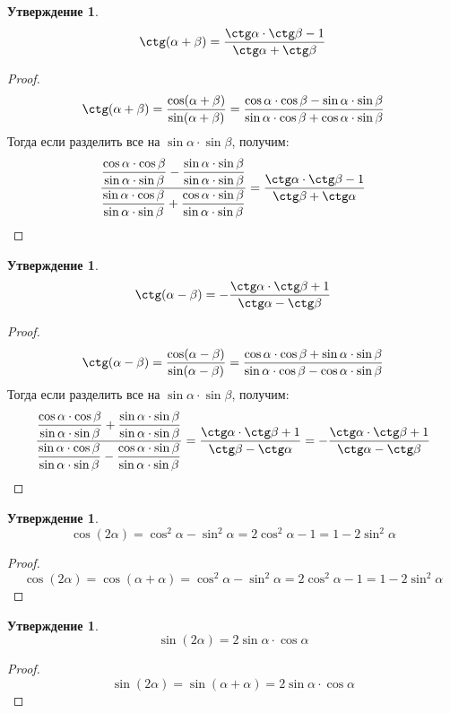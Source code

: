 \documentclass[12pt]{article}
\theoremstyle{definition}
\newtheorem{statement}[theorem]{Утверждение}
\begin{document}
    \begin{statement}
        $$\ctg(\alpha+\beta)=\dfrac{\ctg\alpha\cdot\ctg\beta-1}{\ctg\alpha+\ctg\beta}$$
    \end{statement}
    \begin{proof}
        $$\ctg(\alpha+\beta)=\dfrac{\cos(\alpha+\beta)}{\sin(\alpha+\beta)}=\dfrac{\cos\alpha\cdot\cos\beta-\sin\alpha\cdot\sin\beta}{\sin\alpha\cdot\cos\beta+\cos\alpha\cdot\sin\beta}$$
        Тогда если разделить все на $\sin\alpha\cdot\sin\beta$, получим:
        $$\dfrac{\dfrac{\cos\alpha\cdot\cos\beta}{\sin\alpha\cdot\sin\beta}-\dfrac{\sin\alpha\cdot\sin\beta}{\sin\alpha\cdot\sin\beta}}{\dfrac{\sin\alpha\cdot\cos\beta}{\sin\alpha\cdot\sin\beta}+\dfrac{\cos\alpha\cdot\sin\beta}{\sin\alpha\cdot\sin\beta}}=\dfrac{\ctg\alpha\cdot\ctg\beta-1}{\ctg\beta+\ctg\alpha}$$
    \end{proof}
    \begin{statement}
        $$\ctg(\alpha-\beta)=-\dfrac{\ctg\alpha\cdot\ctg\beta+1}{\ctg\alpha-\ctg\beta}$$
    \end{statement}
    \begin{proof}
        $$\ctg(\alpha-\beta)=\dfrac{\cos(\alpha-\beta)}{\sin(\alpha-\beta)}=\dfrac{\cos\alpha\cdot\cos\beta+\sin\alpha\cdot\sin\beta}{\sin\alpha\cdot\cos\beta-\cos\alpha\cdot\sin\beta}$$
        Тогда если разделить все на $\sin\alpha\cdot\sin\beta$, получим:
        $$\dfrac{\dfrac{\cos\alpha\cdot\cos\beta}{\sin\alpha\cdot\sin\beta}+\dfrac{\sin\alpha\cdot\sin\beta}{\sin\alpha\cdot\sin\beta}}{\dfrac{\sin\alpha\cdot\cos\beta}{\sin\alpha\cdot\sin\beta}-\dfrac{\cos\alpha\cdot\sin\beta}{\sin\alpha\cdot\sin\beta}}=\dfrac{\ctg\alpha\cdot\ctg\beta+1}{\ctg\beta-\ctg\alpha}=-\dfrac{\ctg\alpha\cdot\ctg\beta+1}{\ctg\alpha-\ctg\beta}$$
    \end{proof}
    \begin{statement}
        $$\cos (2\alpha)=\cos^2\alpha-\sin^2\alpha=2\cos^2\alpha-1=1-2\sin^2\alpha$$
    \end{statement}
    \begin{proof}
        $$\cos (2\alpha)=\cos(\alpha + \alpha)=\cos^2\alpha-\sin^2\alpha=2\cos^2\alpha-1=1-2\sin^2\alpha$$
    \end{proof}
    \begin{statement}
        $$\sin(2\alpha)=2 \sin \alpha \cdot \cos \alpha$$
    \end{statement}
    \begin{proof}
        $$\sin(2\alpha)=\sin(\alpha+\alpha)=2 \sin \alpha \cdot \cos \alpha$$
    \end{proof}
\end{document}
